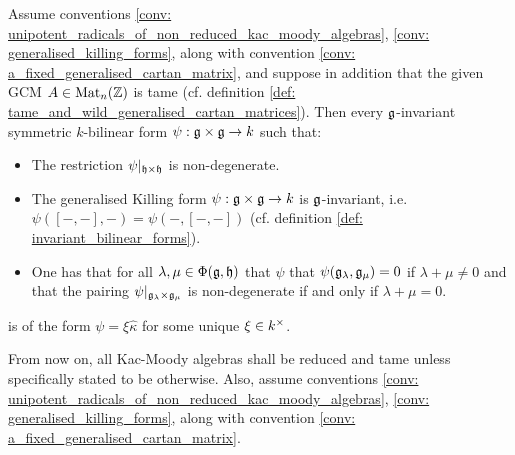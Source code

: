             \begin{proposition} \label{prop: uniqueness_of_generalised_killing_forms}
                \cite[Proposition 16.6]{carter_affine_lie_algebras} Assume conventions \ref{conv: unipotent_radicals_of_non_reduced_kac_moody_algebras}, \ref{conv: generalised_killing_forms}, along with convention \ref{conv: a_fixed_generalised_cartan_matrix}, and suppose in addition that the given GCM $A \in \mathrm{Mat}_n(\mathbb{Z})$ is tame (cf. definition \ref{def: tame_and_wild_generalised_cartan_matrices}). Then every $\mathfrak{g}$-invariant symmetric $k$-bilinear form $\psi: \g \x \g \to k$ such that:
                    \begin{itemize}
                        \item The restriction $\psi|_{\h \x \h}$ is non-degenerate.
                        \item The generalised Killing form $\psi: \g \x \g \to k$ is $\mathfrak{g}$-invariant, i.e. $\psi([-, -], -) = \psi(-, [-, -])$ (cf. definition \ref{def: invariant_bilinear_forms}).
                        \item One has that for all $\lambda, \mu \in \Phi(\mathfrak{g}, \mathfrak{h})$ that $\psi$ that $\psi(\mathfrak{g}_{\lambda}, \mathfrak{g}_{\mu}) = 0$ if $\lambda + \mu \not = 0$ and that the pairing $\psi|_{\g_{\lambda} \x \g_{\mu}}$ is non-degenerate if and only if $\lambda + \mu = 0$.
                    \end{itemize}
                is of the form $\psi = \xi \hat{\kappa}$ for some unique $\xi \in k^{\x}$.
            \end{proposition}
                
            \begin{convention} \label{conv: kac_moody_root_systems}
                From now on, all Kac-Moody algebras shall be reduced and tame unless specifically stated to be otherwise. Also, assume conventions \ref{conv: unipotent_radicals_of_non_reduced_kac_moody_algebras}, \ref{conv: generalised_killing_forms}, along with convention \ref{conv: a_fixed_generalised_cartan_matrix}. 
            \end{convention}
            
